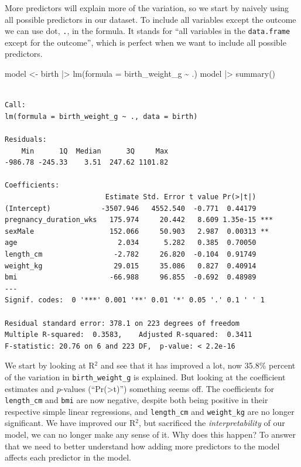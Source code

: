 \documentclass[
  letterpaper,
  DIV=11,
  numbers=noendperiod]{scrreprt}
\newenvironment{Shaded}{\begin{snugshade}}{\end{snugshade}}
\newcommand{\AttributeTok}[1]{\textcolor[rgb]{0.40,0.45,0.13}{#1}}
\newcommand{\FunctionTok}[1]{\textcolor[rgb]{0.28,0.35,0.67}{#1}}
\newcommand{\NormalTok}[1]{\textcolor[rgb]{0.00,0.23,0.31}{#1}}
\newcommand{\OtherTok}[1]{\textcolor[rgb]{0.00,0.23,0.31}{#1}}
\newcommand{\SpecialCharTok}[1]{\textcolor[rgb]{0.37,0.37,0.37}{#1}}
\begin{document}
More predictors will explain more of the variation, so we start by
naively using all possible predictors in our dataset. To include all
variables except the outcome we can use dot, \texttt{.}, in the formula.
It stands for ``all variables in the \texttt{data.frame} except for the
outcome'', which is perfect when we want to include all possible
predictors.

\begin{Shaded}
\begin{Highlighting}[]
\NormalTok{model }\OtherTok{\textless{}{-}}\NormalTok{ birth }\SpecialCharTok{|\textgreater{}} 
  \FunctionTok{lm}\NormalTok{(}\AttributeTok{formula =}\NormalTok{ birth\_weight\_g }\SpecialCharTok{\textasciitilde{}}\NormalTok{ .)}
\NormalTok{model }\SpecialCharTok{|\textgreater{}} \FunctionTok{summary}\NormalTok{()}
\end{Highlighting}
\end{Shaded}

\begin{verbatim}

Call:
lm(formula = birth_weight_g ~ ., data = birth)

Residuals:
    Min      1Q  Median      3Q     Max 
-986.78 -245.33    3.51  247.62 1101.82 

Coefficients:
                        Estimate Std. Error t value Pr(>|t|)    
(Intercept)            -3507.946   4552.540  -0.771  0.44179    
pregnancy_duration_wks   175.974     20.442   8.609 1.35e-15 ***
sexMale                  152.066     50.903   2.987  0.00313 ** 
age                        2.034      5.282   0.385  0.70050    
length_cm                 -2.782     26.820  -0.104  0.91749    
weight_kg                 29.015     35.086   0.827  0.40914    
bmi                      -66.988     96.855  -0.692  0.48989    
---
Signif. codes:  0 '***' 0.001 '**' 0.01 '*' 0.05 '.' 0.1 ' ' 1

Residual standard error: 378.1 on 223 degrees of freedom
Multiple R-squared:  0.3583,    Adjusted R-squared:  0.3411 
F-statistic: 20.76 on 6 and 223 DF,  p-value: < 2.2e-16
\end{verbatim}

We start by looking at R\(^2\) and see that it has improved a lot, now
35.8\% percent of the variation in \texttt{birth\_weight\_g} is
explained. But looking at the coefficient estimates and \(p\)-values
(``Pr(\textgreater\textbar t\textbar)'') something seems off. The
coefficients for \texttt{length\_cm} and \texttt{bmi} are now negative,
despite both being positive in their respective simple linear
regressions, and \texttt{length\_cm} and \texttt{weight\_kg} are no
longer significant. We have improved our R\(^2\), but sacrificed the
\emph{interpretability} of our model, we can no longer make any sense of
it. Why does this happen? To answer that we need to better understand
how adding more predictors to the model affects each predictor in the
model.
\end{document}
